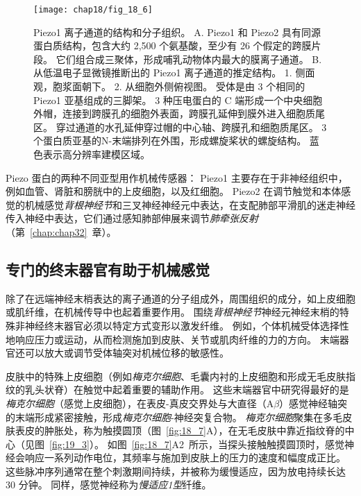\begin{figure}[htbp]
	\centering
	\texttt{[image: chap18/fig\_18\_6]}
	\caption{Piezo1 离子通道的结构和分子组织。
		A. Piezo1 和 Piezo2 具有同源蛋白质结构，包含大约 2,500 个氨基酸，至少有 26 个假定的跨膜片段。
		它们组合成三聚体，形成哺乳动物体内最大的膜离子通道\cite{murthy2017piezos}。
		B. 从低温电子显微镜推断出的 Piezo1 离子通道的推定结构。
		1. 侧面观，胞浆面朝下。
		2. 从细胞外侧俯视图。
		受体是由 3 个相同的 Piezo1 亚基组成的三脚架。
		3 种压电蛋白的 C 端形成一个中央细胞外帽，连接到跨膜孔的细胞外表面，跨膜孔延伸到膜外进入细胞质尾区。
		穿过通道的水孔延伸穿过帽的中心轴、跨膜孔和细胞质尾区。
		3 个蛋白质亚基的N-末端排列在外围，形成螺旋桨状的螺旋结构。
		蓝色表示高分辨率建模区域\cite{saotome2018structure}。}
	\label{fig:18_6}
\end{figure}



Piezo 蛋白的两种不同亚型用作机械传感器：
Piezo1 主要存在于非神经组织中，例如血管、肾脏和膀胱中的上皮细胞，以及红细胞。
Piezo2 在调节触觉和本体感觉的机械感觉\textit{背根神经节}和三叉神经神经元中表达，在支配肺部平滑肌的迷走神经传入神经中表达，它们通过感知肺部伸展来调节\textit{肺牵张反射}（第~\ref{chap:chap32}~章）。



\subsection{专门的终末器官有助于机械感觉}

除了在远端神经末梢表达的离子通道的分子组成外，周围组织的成分，如上皮细胞或肌纤维，在机械传导中也起着重要作用。
围绕\textit{背根神经节}神经元神经末梢的特殊非神经终末器官必须以特定方式变形以激发纤维。
例如，个体机械受体选择性地响应压力或运动，从而检测施加到皮肤、关节或肌肉纤维的力的方向。
末端器官还可以放大或调节受体轴突对机械位移的敏感性。


皮肤中的特殊上皮细胞（例如\textit{梅克尔细胞}、毛囊内衬的上皮细胞和形成无毛皮肤指纹的乳头状脊）在触觉中起着重要的辅助作用。
这些末端器官中研究得最好的是\textit{梅克尔细胞}（感觉上皮细胞），在表皮-真皮交界处与大直径（A$\beta$）感觉神经轴突的末端形成紧密接触，形成\textit{梅克尔细胞}-神经突复合物。
\textit{梅克尔细胞}聚集在多毛皮肤表皮的肿胀处，称为触摸圆顶（图~\ref{fig:18_7}A），在无毛皮肤中靠近指纹脊的中心（见图~\ref{fig:19_3}）。
如图~\ref{fig:18_7}A2~所示，当探头接触触摸圆顶时，感觉神经会响应一系列动作电位，其频率与施加到皮肤上的压力的速度和幅度成正比。
这些脉冲序列通常在整个刺激期间持续，并被称为缓慢适应，因为放电持续长达 30 分钟。
同样，感觉神经称为\textit{慢适应1型}纤维。


